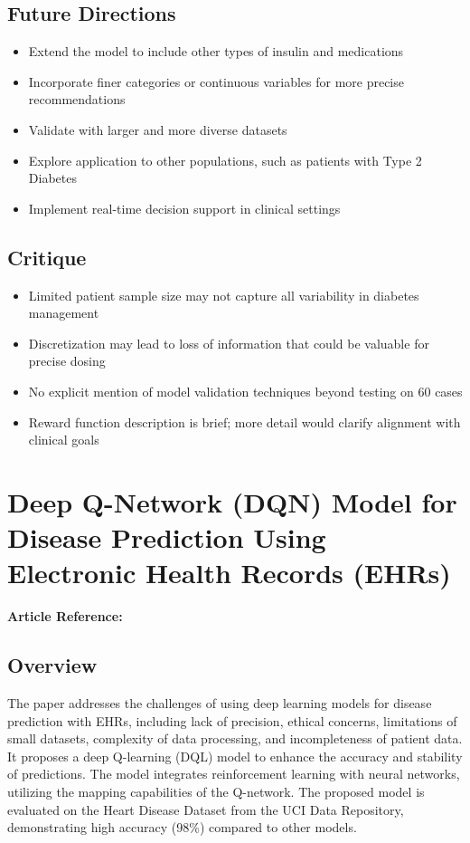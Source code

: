 \subsection*{Future Directions}
\begin{itemize}
    \item Extend the model to include other types of insulin and medications
    \item Incorporate finer categories or continuous variables for more precise recommendations
    \item Validate with larger and more diverse datasets
    \item Explore application to other populations, such as patients with Type 2 Diabetes
    \item Implement real-time decision support in clinical settings
\end{itemize}

\subsection*{Critique}
\begin{itemize}
    \item Limited patient sample size may not capture all variability in diabetes management
    \item Discretization may lead to loss of information that could be valuable for precise dosing
    \item No explicit mention of model validation techniques beyond testing on 60 cases
    \item Reward function description is brief; more detail would clarify alignment with clinical goals
\end{itemize}






\section{Deep Q-Network (DQN) Model for Disease Prediction Using Electronic Health Records (EHRs)}
\textbf{Article Reference:} \cite{article_10}

\subsection*{Overview}
The paper addresses the challenges of using deep learning models for disease prediction with EHRs, including lack of precision, ethical concerns, limitations of small datasets, complexity of data processing, and incompleteness of patient data. It proposes a deep Q-learning (DQL) model to enhance the accuracy and stability of predictions. The model integrates reinforcement learning with neural networks, utilizing the mapping capabilities of the Q-network. The proposed model is evaluated on the Heart Disease Dataset from the UCI Data Repository, demonstrating high accuracy (98\%) compared to other models.

